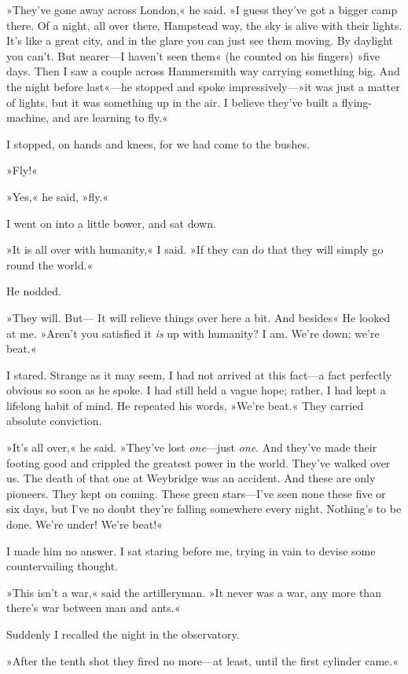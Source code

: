 »They've gone away across London,« he said. »I guess they've got a bigger camp there. Of a night, all over there, Hampstead way, the sky is alive with their lights. It's like a great city, and in the glare you can just see them moving. By daylight you can't. But nearer—I haven't seen them\longdash« (he counted on his fingers) »five days. Then I saw a couple across Hammersmith way carrying something big. And the night before last«—he stopped and spoke impressively—»it was just a matter of lights, but it was something up in the air. I believe they've built a flying-machine, and are learning to fly.«

I stopped, on hands and knees, for we had come to the bushes.

»Fly!«

»Yes,« he said, »fly.«

I went on into a little bower, and sat down.

»It is all over with humanity,« I said. »If they can do that they will simply go round the world.«

He nodded.

»They will. But— It will relieve things over here a bit. And besides\longdash« He looked at me. »Aren't you satisfied it \textit{is} up with humanity? I am. We're down; we're beat.«

I stared. Strange as it may seem, I had not arrived at this fact—a fact perfectly obvious so soon as he spoke. I had still held a vague hope; rather, I had kept a lifelong habit of mind. He repeated his words, »We're beat.« They carried absolute conviction.

»It's all over,« he said. »They've lost \textit{one}—just \textit{one}. And they've made their footing good and crippled the greatest power in the world. They've walked over us. The death of that one at Weybridge was an accident. And these are only pioneers. They kept on coming. These green stars—I've seen none these five or six days, but I've no doubt they're falling somewhere every night. Nothing's to be done. We're under! We're beat!«

I made him no answer. I sat staring before me, trying in vain to devise some countervailing thought.

»This isn't a war,« said the artilleryman. »It never was a war, any more than there's war between man and ants.«

Suddenly I recalled the night in the observatory.

»After the tenth shot they fired no more—at least, until the first cylinder came.«


